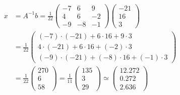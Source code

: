 \begin{loesung}
\begin{teilaufgaben}
\begin{align*}
x&
=
A^{-1}b=
\frac1{22}
\begin{pmatrix}
-7&  6& 9\\
 4&  6&-2\\
-9&- 8&-1
\end{pmatrix}
\begin{pmatrix}
-21\\16\\3
\end{pmatrix}
\\
&=
\frac1{22}
\begin{pmatrix}
(-7)\cdot(-21)+6\cdot 16+9\cdot 3\\
4\cdot (-21)+ 6\cdot 16+ (-2)\cdot 3\\
(-9)\cdot(-21)+ (-8)\cdot 16+ (-1)\cdot 3
\end{pmatrix}
\\
&
=
\frac1{22}
\begin{pmatrix}
270\\
6\\
58
\end{pmatrix}
=
\frac1{11}
\begin{pmatrix}
135\\
3\\
29
\end{pmatrix}
\simeq
\begin{pmatrix}
   12.272\\
    0.272\\
    2.636
\end{pmatrix}
\end{align*}
\end{teilaufgaben}
\end{loesung}
